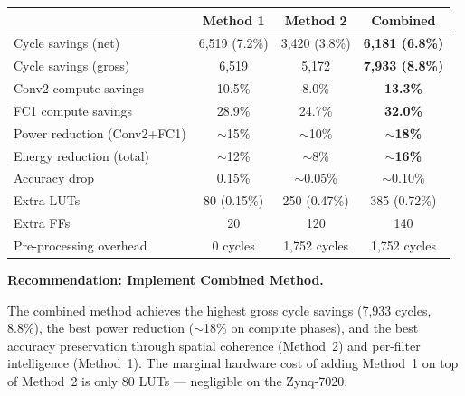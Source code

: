 \documentclass[11pt,a4paper]{article}
\begin{document}
\begin{center}
\renewcommand{\arraystretch}{1.3}
\begin{tabular}{p{4.5cm}ccc}
\toprule
& \textbf{Method 1} & \textbf{Method 2} & \textbf{Combined} \\
\midrule
\rowcolor{lightgray}
Cycle savings (net) & 6,519 (7.2\%) & 3,420 (3.8\%) & \textcolor{combpurple}{\textbf{6,181 (6.8\%)}} \\
Cycle savings (gross) & 6,519 & 5,172 & \textcolor{combpurple}{\textbf{7,933 (8.8\%)}} \\
\rowcolor{lightgray}
Conv2 compute savings & 10.5\% & 8.0\% & \textcolor{combpurple}{\textbf{13.3\%}} \\
FC1 compute savings & 28.9\% & 24.7\% & \textcolor{combpurple}{\textbf{32.0\%}} \\
\rowcolor{lightgray}
Power reduction (Conv2+FC1) & $\sim$15\% & $\sim$10\% & \textcolor{combpurple}{\textbf{$\sim$18\%}} \\
Energy reduction (total) & $\sim$12\% & $\sim$8\% & \textcolor{combpurple}{\textbf{$\sim$16\%}} \\
\rowcolor{lightgray}
Accuracy drop & 0.15\% & $\sim$0.05\% & $\sim$0.10\% \\
Extra LUTs & 80 (0.15\%) & 250 (0.47\%) & 385 (0.72\%) \\
\rowcolor{lightgray}
Extra FFs & 20 & 120 & 140 \\
Pre-processing overhead & 0 cycles & 1,752 cycles & 1,752 cycles \\
\bottomrule
\end{tabular}
\end{center}

\vspace{12pt}
\noindent\Large\textbf{Recommendation: Implement Combined Method.}
\normalsize

\vspace{6pt}
\noindent The combined method achieves the highest gross cycle savings (7,933 cycles,
8.8\%), the best power reduction ($\sim$18\% on compute phases), and the best
accuracy preservation through spatial coherence (Method~2) and per-filter
intelligence (Method~1). The marginal hardware cost of adding Method~1 on top
of Method~2 is only 80 LUTs — negligible on the Zynq-7020.
\end{document}

